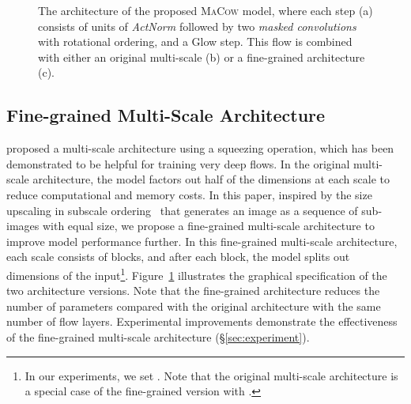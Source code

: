 \documentclass{article}
\begin{document}
\begin{figure}[t]
\centering
\begin{minipage}[t]{0.99\linewidth}
\label{fig:architecture:step}
\end{minipage}
\caption{The architecture of the proposed \textsc{MaCow} model, where each step (a) consists of  units of \emph{ActNorm} followed by two \emph{masked convolutions} with rotational ordering, and a Glow step. 
This flow is combined with either an original multi-scale (b) or a fine-grained architecture (c).}
\label{fig:architecture}
\end{figure}

\subsection{Fine-grained Multi-Scale Architecture}\label{subsec:multi-scale}
\citet{dinh2016density} proposed a multi-scale architecture using a squeezing operation, which has been demonstrated to be helpful for training very deep flows.
In the original multi-scale architecture, the model factors out half of the dimensions at each scale to reduce computational and memory costs.
In this paper, inspired by the size upscaling in subscale ordering~\citep{menick2018generating} that generates an image as a sequence of sub-images with equal size, we propose a fine-grained multi-scale architecture to improve model performance further.
In this fine-grained multi-scale architecture, each scale consists of  blocks, and after each block, the model splits out  dimensions of the input\footnote{In our experiments, we set . Note that the original multi-scale architecture is a special case of the fine-grained version with .}. 
Figure~\ref{fig:architecture} illustrates the graphical specification of the two architecture versions.
Note that the fine-grained architecture reduces the number of parameters compared with the original architecture with the same number of flow layers. 
Experimental improvements demonstrate the effectiveness of the fine-grained multi-scale architecture (\S\ref{sec:experiment}).
\end{document}
